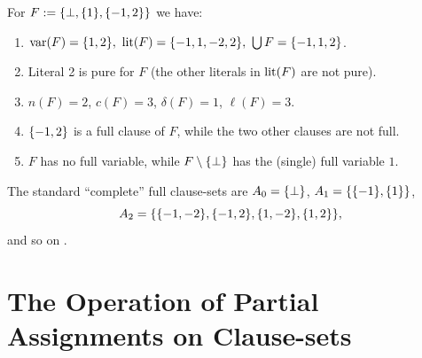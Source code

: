\documentclass[12pt]{book}
\begin{document}
\begin{examp}\label{exp:measurecls}
  For $F := \{ \bot, \{ 1 \},\{ -1,2 \} \}$ we have:
  \begin{enumerate}
  \item $\operatorname{var}(F) = \{1, 2\},\ \operatorname{lit}(F) = \{- 1, 1,- 2, 2\},\ \bigcup F = \{-1, 1, 2\}$.
  \item Literal 2 is pure for $F$ (the other literals in $\operatorname{lit}(F)$ are not pure).
  \item $n(F) = 2$, $c(F) = 3$, $\delta(F) = 1$, $\ell(F) = 3$.
  \item $\{ -1,2 \}$ is a full clause of $F$, while the two other clauses are not full.
  \item $F$ has no full variable, while $F \setminus \{ \bot \}$ has the (single) full variable $1$.
  \end{enumerate}
  The standard ``complete'' full clause-sets are $A_0 = \{ \bot \}$, $A_1 = \{ \{ -1 \},\{ 1 \} \}$,
  \begin{displaymath}
    A_2 = \{ \{ -1,-2 \},\{ -1,2 \},\{ 1,-2 \},\{ 1,2 \} \},
  \end{displaymath}
  and so on \cite{h12}.
\end{examp}
\section{The Operation of Partial Assignments on Clause-sets}
\label{sec:oppasscls}
\end{document}
